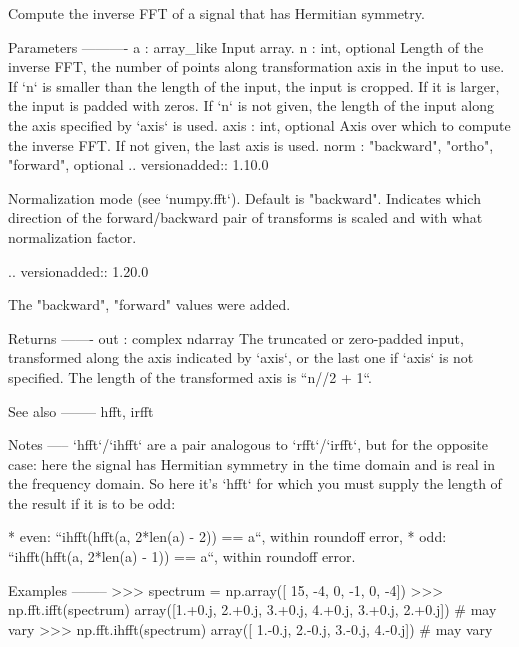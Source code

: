 \begin{DoxyVerb}Compute the inverse FFT of a signal that has Hermitian symmetry.

Parameters
----------
a : array_like
    Input array.
n : int, optional
    Length of the inverse FFT, the number of points along
    transformation axis in the input to use.  If `n` is smaller than
    the length of the input, the input is cropped.  If it is larger,
    the input is padded with zeros. If `n` is not given, the length of
    the input along the axis specified by `axis` is used.
axis : int, optional
    Axis over which to compute the inverse FFT. If not given, the last
    axis is used.
norm : {"backward", "ortho", "forward"}, optional
    .. versionadded:: 1.10.0

    Normalization mode (see `numpy.fft`). Default is "backward".
    Indicates which direction of the forward/backward pair of transforms
    is scaled and with what normalization factor.

    .. versionadded:: 1.20.0

        The "backward", "forward" values were added.

Returns
-------
out : complex ndarray
    The truncated or zero-padded input, transformed along the axis
    indicated by `axis`, or the last one if `axis` is not specified.
    The length of the transformed axis is ``n//2 + 1``.

See also
--------
hfft, irfft

Notes
-----
`hfft`/`ihfft` are a pair analogous to `rfft`/`irfft`, but for the
opposite case: here the signal has Hermitian symmetry in the time
domain and is real in the frequency domain. So here it's `hfft` for
which you must supply the length of the result if it is to be odd:

* even: ``ihfft(hfft(a, 2*len(a) - 2)) == a``, within roundoff error,
* odd: ``ihfft(hfft(a, 2*len(a) - 1)) == a``, within roundoff error.

Examples
--------
>>> spectrum = np.array([ 15, -4, 0, -1, 0, -4])
>>> np.fft.ifft(spectrum)
array([1.+0.j,  2.+0.j,  3.+0.j,  4.+0.j,  3.+0.j,  2.+0.j]) # may vary
>>> np.fft.ihfft(spectrum)
array([ 1.-0.j,  2.-0.j,  3.-0.j,  4.-0.j]) # may vary\end{DoxyVerb}
 \mbox{\label{namespacenumpy_1_1fft_1_1__pocketfft_a38af6eaf756a8aa41136f64e82256fc9}} 
